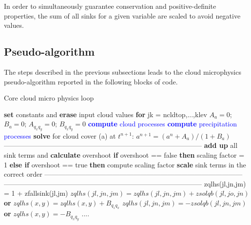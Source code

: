 \documentclass[
a4paper,     %
12pt,        %
article,
onecolumn,   %
openany,     %
]{memoir}
\begin{document}
In order to simultaneously guarantee conservation and
positive-definite properties, the sum of all sinks for 
a given variable are scaled to avoid negative values. 


\newpage
\subsection{Pseudo-algorithm}
The steps described in the previous subsections leads to the cloud 
microphysics pseudo-algorithm reported in the following blocks 
of code.

\newpage
%
\begin{algorithm}[H]
\caption{Core cloud micro physics loop}\label{alg:core-loop}
\begin{algorithmic}
\State \textbf{set} constants and \textbf{erase} input cloud values
\vspace{.1cm}
\State \textbf{for} jk = ncldtop,...,klev
\Indent
{}
\Indent
\State $A_{a} = 0$;\;\;\; $B_{a} = 0$; \;\;\; 
$A_{q_{x} q_{y}} = 0$; \;\;\; $B_{q_{x} q_{y}} = 0$
\EndIndent
\vspace{.2cm}
\State \textcolor{blue}{\textbf{compute} cloud processes} \label{lis:cloud-proc}
\State \textcolor{blue}{\textbf{compute} precipitation processes} \label{lis:precipitation-proc}
\vspace{.3cm}
\State \textbf{solve} for cloud cover (a) at $t^{n+1}$: $a^{n+1} = (a^{n} + A_{a})/(1 + B_{a})$
\vspace{.1cm}
\Indent
\vspace{-.2cm}
\State ---------------------------------------------------------------------------------------
\vspace{-.2cm}
\State \textbf{add up} all sink terms and \textbf{calculate} overshoot
\State \textbf{if} overshoot == false \textbf{then} scaling factor = 1
\State \textbf{else if} overshoot == true \textbf{then} compute scaling factor 
\State \textbf{scale} sink terms in the correct order
\EndFor
\EndFor
\EndFor
\vspace{-.2cm}
\State ---------------------------------------------------------------------------------------
\vspace{-.2cm}
\EndIndent
\vspace{.5cm}
\Indent
\vspace{-.2cm}
\State ---------------------------------------------------------------------------------------
\vspace{-.2cm}
\State zqlhs(jl,jn,jm) = 1 + zfallsink(jl,jm)
\State $zqlhs(jl,jn,jm)=zqlhs(jl,jn,jm) + zsolqb(jl,jo,jn)$ 
\State \textbf{or} $zqlhs(x,y) = zqlhs(x,y) + B_{q_z q_x}$
\EndFor
\EndIf
{}
\State $zqlhs(jl,jn,jm)= -zsolqb(jl,jn,jm)$ 
\State \textbf{or}  $zqlhs(x,y) = - B_{q_x q_y}$
\EndIf
\EndFor
\EndFor
\EndFor
\State ....
\EndIndent
\EndIndent
{}
\end{algorithmic}
\end{algorithm}
\end{document}
